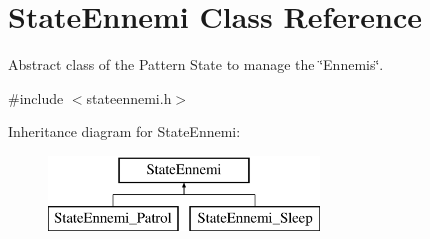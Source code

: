 \hypertarget{class_state_ennemi}{}\section{State\+Ennemi Class Reference}
\label{class_state_ennemi}


Abstract class of the Pattern State to manage the \char`\"{}\+Ennemis\char`\"{}.  




{\ttfamily \#include $<$stateennemi.\+h$>$}

Inheritance diagram for State\+Ennemi\+:\begin{figure}[H]
\begin{center}
\leavevmode
\includegraphics[height=2.000000cm]{class_state_ennemi}
\end{center}
\end{figure}
